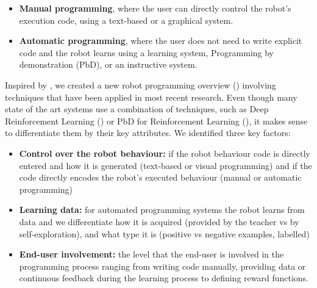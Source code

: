 \begin{itemize}
 \item {\textbf{Manual programming}, where the user can directly control the robot's execution code, using a text-based or a graphical system.}
 \item {\textbf{Automatic programming}, where the user does not need to write explicit code and the robot learns using a learning system, Programming by demonstration (PbD), or an instructive system.}
\end{itemize}


Inspired by \cite{Biggs2003}, we created a new robot programming overview () involving techniques that have been applied in most recent research.
Even though many state of the art systems use a combination of techniques, such as Deep Reinforcement Learning (\cite{arulkumaran2017brief}) or PbD for Reinforcement Learning (\cite{hester2017learning}), it makes sense to differentiate them by their key attributes.
We identified three key factors: 
\begin{itemize}
	\item \textbf{Control over the robot behaviour:} if the robot behaviour code is directly entered and how it is generated (text-based or visual programming) and if the code directly encodes the robot's executed behaviour (manual or automatic programming)
	\item \textbf{Learning data:} for automated programming systems the robot learns from data and we differentiate how it is acquired (provided by the teacher vs by self-exploration), and what type it is (\eg positive vs negative examples, labelled)
	\item \textbf{End-user involvement:} the level that the end-user is involved in the programming process ranging from writing code manually, providing data or continuous feedback during the learning process to defining reward functions.
\end{itemize}

